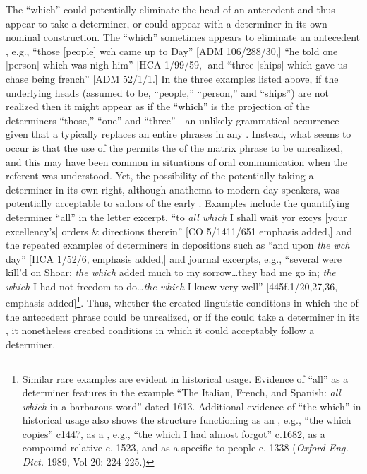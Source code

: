 The  “which” could potentially eliminate the head  of an antecedent  and thus appear to take a determiner, or could appear with a determiner in its own nominal construction. The  “which” sometimes appears to eliminate an antecedent , e.g., “those [people] wch came up to Day” [ADM 106/288/30,] “he told one [person] which was nigh him” [HCA 1/99/59,] and “three [ships] which gave us chase being french” [ADM 52/1/1.] In the three examples listed above, if the underlying  heads (assumed to be, “people,” “person,” and “ships”) are not realized then it might appear as if the  “which” is the  projection of the determiners “those,” “one” and “three” - an unlikely grammatical occurrence given that a  typically replaces an entire  phrases in any . Instead, what seems to occur is that the use of the  permits the  of the matrix phrase to be unrealized, and this may have been common in situations of oral communication when the referent was understood. Yet, the possibility of the  potentially taking a determiner in its own right, although anathema to modern-day speakers, was potentially acceptable to sailors of the early . Examples include the quantifying determiner “all” in the letter excerpt, “to \textit{all which} I shall wait yor excys [your excellency’s] orders \& directions therein” [CO 5/1411/651 emphasis added,] and the repeated examples of  determiners in depositions such as “and upon \textit{the wch} day” [HCA 1/52/6, emphasis added,] and journal excerpts, e.g., “several were kill’d on Shoar; \textit{the which} added much to my sorrow…they bad me go in; \textit{the which} I had not freedom to do…\textit{the which} I knew very well” [445f.1/20,27,36, emphasis added]\footnote{Similar rare examples are evident in historical usage. Evidence of “all” as a determiner features in the example “The Italian, French, and Spanish: \textit{all which} in a barbarous word” dated 1613. Additional evidence of “the which” in historical usage also shows the structure functioning as an , e.g., “the which copies” c1447, as a , e.g., “the which I had almost forgot” c.1682, as a compound relative c. 1523, and as a  specific to people c. 1338 (\textit{Oxford Eng. Dict.} 1989, Vol 20: 224-225.)}. Thus, whether the  created linguistic conditions in which the  of the antecedent phrase could be unrealized, or if the  could take a determiner in its , it nonetheless created conditions in which it could acceptably follow a determiner. 

